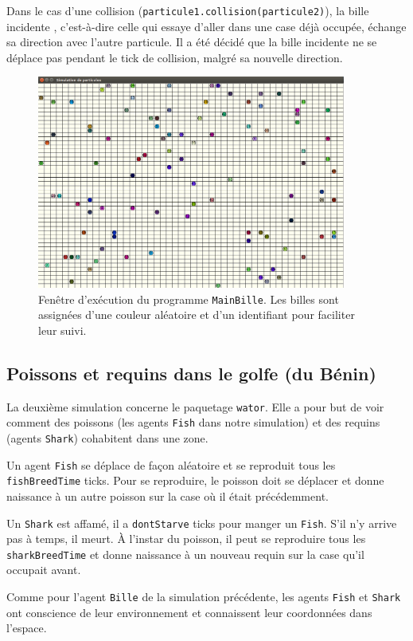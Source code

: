 \documentclass[a4paper]{article}
\begin{document}
\medskip
Dans le cas d'une collision (\texttt{particule1.collision(particule2)}), la bille \og incidente \fg{}, c'est-à-dire celle qui essaye d'aller dans une case déjà occupée, échange sa direction avec l'autre particule. Il a été décidé que la bille incidente ne se déplace pas pendant le tick de collision, malgré sa nouvelle direction.
 
\begin{figure}[!h]
\centering
\includegraphics[height=7cm]{particules.png}
\caption{Fenêtre d'exécution du programme \texttt{MainBille}. Les billes sont assignées d'une couleur aléatoire et d'un identifiant pour faciliter leur suivi.}
\end{figure}
\subsection{Poissons et requins dans le golfe (du Bénin)}
La deuxième simulation concerne le paquetage \texttt{wator}. Elle a pour but de voir comment des poissons (les agents \texttt{Fish} dans notre simulation) et des requins (agents \texttt{Shark}) cohabitent dans une zone. 

\medskip
Un agent \texttt{Fish} se déplace de façon aléatoire et se reproduit tous les \texttt{fishBreedTime} ticks. Pour se reproduire, le poisson doit se déplacer et donne naissance à un autre poisson sur la case où il était précédemment.

\medskip
Un \texttt{Shark} est affamé, il a \texttt{dontStarve} ticks pour manger un \texttt{Fish}. S'il n'y arrive pas à temps, il meurt. À l'instar du poisson, il peut se reproduire tous les \texttt{sharkBreedTime} et donne naissance à un nouveau requin sur la case qu'il occupait avant.

\medskip
Comme pour l'agent \texttt{Bille} de la simulation précédente, les agents \texttt{Fish} et \texttt{Shark} ont conscience de leur environnement et connaissent leur coordonnées dans l'espace.
\end{document}
